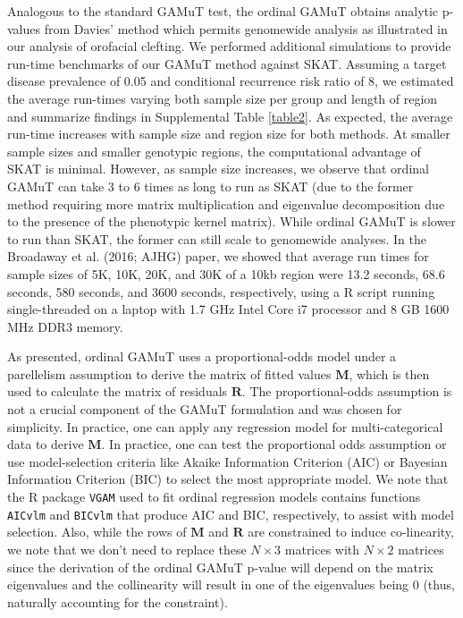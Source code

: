 \documentclass[]{article}
\begin{document}
Analogous to the standard GAMuT test, the ordinal GAMuT obtains analytic p-values from Davies' method \citep{Davies1980} which permits genomewide analysis as illustrated in our analysis of orofacial clefting. We performed additional simulations to provide run-time benchmarks of our GAMuT method against SKAT. Assuming a target disease prevalence of 0.05 and conditional recurrence risk ratio of 8, we estimated the average run-times varying both sample size per group and length of region and summarize findings in Supplemental Table \ref{table2}. As expected, the average run-time increases with sample size and region size for both methods. At smaller sample sizes and smaller genotypic regions, the computational advantage of SKAT is minimal. However, as sample size increases, we observe that ordinal GAMuT can take 3 to 6 times as long to run as SKAT (due to the former method requiring more matrix multiplication and eigenvalue decomposition due to the presence of the phenotypic kernel matrix). While ordinal GAMuT is slower to run than SKAT, the former can still scale to genomewide analyses. In the Broadaway et al. (2016; AJHG) paper, we showed that average run times for sample sizes of 5K, 10K, 20K, and 30K of a 10kb region were 13.2 seconds, 68.6 seconds, 580 seconds, and 3600 seconds, respectively, using a R script running single-threaded on a laptop with 1.7 GHz Intel Core i7 processor and 8 GB 1600 MHz DDR3 memory.

As presented, ordinal GAMuT uses a proportional-odds model under a parellelism assumption to derive the matrix of fitted values \(\mathbf{M}\), which is then used to calculate the matrix of residuals \(\mathbf{R}\). The proportional-odds assumption is not a crucial component of the GAMuT formulation and was chosen for simplicity. In practice, one can apply any regression model for multi-categorical data to derive \(\mathbf{M}\). In practice, one can test the proportional odds assumption or use model-selection criteria like Akaike Information Criterion (AIC) or Bayesian Information Criterion (BIC) to select the most appropriate model. We note that the R package \texttt{VGAM} used to fit ordinal regression models contains functions \texttt{AICvlm} and \texttt{BICvlm} that produce AIC and BIC, respectively, to assist with model selection. Also, while the rows of \(\mathbf{M}\) and \(\mathbf{R}\) are constrained to induce co-linearity, we note that we don't need to replace these \(N \times 3\) matrices with \(N \times 2\) matrices since the derivation of the ordinal GAMuT p-value will depend on the matrix eigenvalues and the collinearity will result in one of the eigenvalues being 0 (thus, naturally accounting for the constraint).
\end{document}

